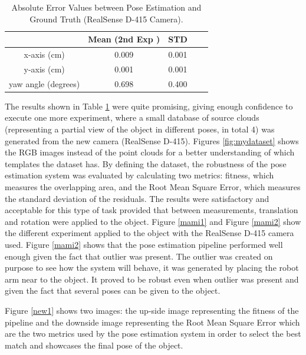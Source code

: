 \begin{table}[ht]
\renewcommand{\arraystretch}{1.3}
\caption{Absolute Error Values between Pose Estimation and Ground Truth (RealSense D-415 Camera).}
\label{abso}
\centering
\begin{tabular}{|c|c|c|c|c|}
\hline
  & Mean (2nd Exp )& STD \\
\hline
x-axis (cm) & 0.009 & 0.001
 \\
\hline
y-axis (cm) & 0.001 & 0.001  \\
\hline
yaw angle (degrees)& 0.698 & 0.400 \\
\hline
\end{tabular}
\end{table}

The results shown in Table \ref{abso} were quite promising, giving enough confidence to execute one more experiment, where a small database of source clouds (representing a partial view of the object in different poses, in total 4) was generated from the new camera (RealSense D-415). Figures \ref{fig:mydataset} shows the RGB images instead of the point clouds for a better understanding of which templates the dataset has. By defining the dataset, the robustness of the pose estimation system was evaluated by calculating two metrics: fitness, which measures the overlapping area, and the Root Mean Square Error, which measures the standard deviation of the residuals. The results were satisfactory and acceptable for this type of task provided that between measurements, translation and rotation were applied to the object. Figure \ref{mami1} and Figure \ref{mami2} show the different experiment applied to the object with the RealSense D-415 camera used. Figure \ref{mami2} shows that the pose estimation pipeline performed well enough given the fact that outlier was present. The outlier was created on purpose to see how the system will behave, it was generated by placing the robot arm near to the object. It proved to be robust even when outlier was present and given the fact that several poses can be given to the object.  

Figure \ref{new1} shows two images: the up-side image representing the fitness of the pipeline and the downside image representing the Root Mean Square Error which are the two metrics used by the pose estimation system in order to select the best match and showcases the final pose of the object.


